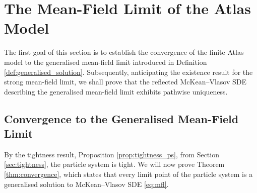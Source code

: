 \documentclass[11pt, a4paper]{article}
\theoremstyle{plain}
\theoremstyle{definition}
\theoremstyle{remark}
\numberwithin{equation}{section}
\begin{document}
\section{The Mean-Field Limit of the Atlas Model} \label{sec:mfl}

The first goal of this section is to establish the convergence of the finite Atlas model to the generalised mean-field limit introduced in Definition \ref{def:generalised_solution}. Subsequently, anticipating the existence result for the strong mean-field limit, we shall prove that the reflected McKean--Vlasov SDE describing the generalised mean-field limit exhibits pathwise uniqueness. 

\subsection{Convergence to the Generalised Mean-Field Limit}

By the tightness result, Proposition \ref{prop:tightness_ps}, from Section \ref{sec:tightness}, the particle system is tight. We will now prove Theorem \ref{thm:convergence}, which states that every limit point of the particle system is a generalised solution to McKean--Vlasov SDE \eqref{eq:mfl}.
\end{document}
